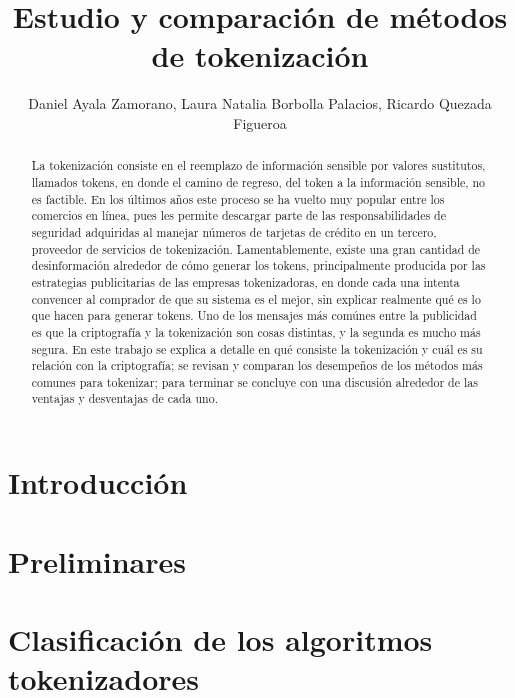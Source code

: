 \documentclass[11pt]{llncs}
\begin{document}
  \title{Estudio y comparación de métodos de tokenización}
  \author{Daniel Ayala Zamorano,
     Laura Natalia Borbolla Palacios,
     Ricardo Quezada Figueroa}
  \maketitle

  \begin{abstract}
    La tokenización consiste en el reemplazo de información sensible por valores
    sustitutos, llamados tokens, en donde el camino de regreso, del  token a la
    información sensible, no es factible. En los últimos años este proceso se ha
    vuelto muy popular entre los comercios en línea, pues les permite descargar
    parte de las responsabilidades de seguridad adquiridas al manejar números de
    tarjetas de crédito en un tercero, proveedor de servicios de tokenización.
    Lamentablemente, existe una gran cantidad de desinformación alrededor de
    cómo generar los tokens, principalmente producida por las estrategias
    publicitarias de las empresas tokenizadoras, en donde cada una intenta
    convencer al comprador de que su sistema es el mejor, sin explicar realmente
    qué es lo que hacen para generar tokens. Uno de los mensajes más comúnes
    entre la publicidad es que la criptografía y la tokenización son cosas
    distintas, y la segunda es mucho más segura. En este trabajo se explica a
    detalle en qué consiste la tokenización y cuál es su relación con la
    criptografía; se revisan y comparan los desempeños de los métodos más comunes
    para tokenizar; para terminar se concluye con una discusión alrededor de las
    ventajas y desventajas de cada uno.
  \end{abstract}

  \section{Introducción}

  \section{Preliminares}

  \section{Clasificación de los algoritmos tokenizadores}
\end{document}
